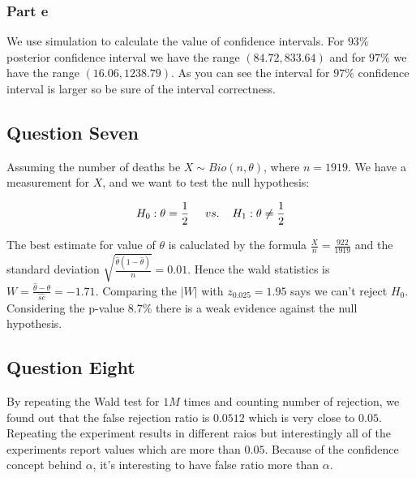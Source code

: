 \documentclass[12pt, a4paper]{book}
\begin{document}
\subsubsection*{Part e}

We use simulation to calculate the value of confidence intervals. For $93\%$ posterior confidence interval
we have the range $(84.72, 833.64)$ and for $97\%$ we have the range $(16.06, 1238.79)$. As you can see the
interval for $97\%$ confidence interval is larger so be sure of the interval correctness.

\subsection*{Question Seven}

Assuming the number of deaths be $X \sim Bio(n, \theta)$, where $n=1919$.
We have a measurement for $X$, and we want to test the null hypothesis:

$$H_0:\theta=\frac{1}{2} \hspace{0.5cm} vs. \hspace{0.4cm} H_1:\theta \neq \frac{1}{2}$$

The best estimate for value of $\theta$ is caluclated by the formula $\frac{X}{n}=\frac{922}{1919}$ and the
standard deviation $\sqrt{\frac{\hat{\theta}(1-\hat{\theta})}{n}} = 0.01$. Hence the wald statistics is
$W = \frac{\hat{\theta} - \theta}{\hat{se}}=-1.71$. Comparing the $|W|$ with $z_{0.025}=1.95$ says we can't
reject $H_0$. Considering the p-value $8.7$\% there is a weak evidence against the null hypothesis.

\subsection*{Question Eight}

By repeating the Wald test for $1M$ times and counting number of rejection, we found out that
the false rejection ratio is $0.0512$ which is very close to $0.05$. Repeating the experiment results
in different raios but interestingly all of the experiments report values which are more than $0.05$.
Because of the confidence concept behind $\alpha$, it's interesting to have false ratio more than $\alpha$.
\end{document}
